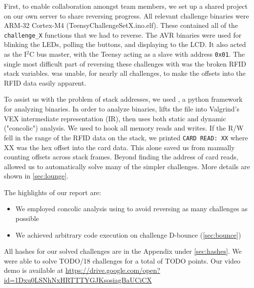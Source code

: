 First, to enable collaboration amongst team members, we set up a \ghidra shared
project on our own server to share reversing progress.
All relevant challenge binaries were ARM-32 Cortex-M4 (TeensyChallengeSetX.ino.elf).
These contained all of the \texttt{challenge\_X} functions that we had to reverse.
The AVR binaries were used for blinking the LEDs, polling the buttons, and displaying to the LCD. It also acted as the I$^{2}$C bus master, with the Teensy acting as a slave with address \texttt{0x01}.
The single most
difficult part of reversing these challenges with \ghidra was the broken RFID
stack variables. \ghidra was unable, for nearly all challenges, to make the
offsets into the RFID data easily apparent.

To assist us with the problem of stack addresses, we used \angr, a python framework for analyzing binaries. In order to analyze binaries, \angr lifts the file into Valgrind's VEX intermediate representation (IR), then uses both static and dynamic ("concolic") analysis. We used \angr to hook all memory reads and writes. If the R/W fell in the range of the RFID
data on the stack, we printed \texttt{CARD READ: XX} where XX was the hex
offset into the card data. This alone saved us from manually counting offsets
across stack frames. Beyond finding the address of card reads, \angr allowed us to automatically solve many of the simpler challenges. More details are shown in \autoref{sec:lounge}.

\vspace{0.5cm}
\noindent The highlights of our report are:
\begin{itemize}
  \item We employed concolic analysis using \angr to avoid reversing as many challenges as possible
  \item We achieved arbitrary code execution on challenge \mbox{D-bounce} (\autoref{sec:bounce})
\end{itemize}

All hashes for our solved challenges are in the Appendix under \autoref{sec:hashes}.
We were able to solve TODO/18 challenges for a total of TODO points.
Our video demo is available at \url{https://drive.google.com/open?id=1Dxu0LSNhNxHRTTTYGJKsosiagBaUCiCX}


